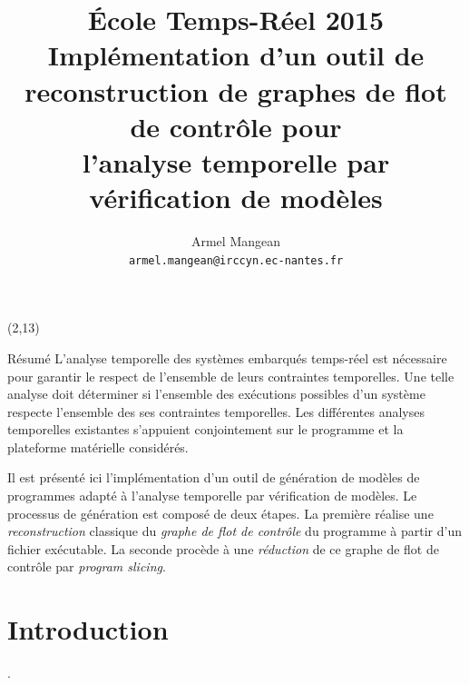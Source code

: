 \documentclass[final]{beamer}
\title{{\large École Temps-Réel 2015} \\[.3em]
  Implémentation d'un outil de \\
  reconstruction de graphes de flot de contrôle pour \\
  l'analyse temporelle par vérification de modèles}
\author{Armel Mangean \\
  \texttt{armel.mangean@irccyn.ec-nantes.fr}}
\begin{document}
  \begin{frame}

    
    \begin{textblock}{39}(2,13)
      \begin{block}{Résumé}\small
        L'analyse temporelle des systèmes embarqués temps-réel est nécessaire
        pour garantir le respect de l'ensemble de leurs contraintes
        temporelles. Une telle analyse doit déterminer si l'ensemble des
        exécutions possibles d'un système respecte l'ensemble des ses
        contraintes temporelles. Les différentes analyses temporelles existantes
        s'appuient conjointement sur le programme et la plateforme matérielle
        considérés.
        \vspace{.5em}
  
        Il est présenté ici l'implémentation d'un outil de génération de modèles
        de programmes adapté à l'analyse temporelle par vérification de
        modèles. Le processus de génération est composé de deux étapes. La
        première réalise une \textit{reconstruction} classique du \textit{graphe
          de flot de contrôle} du programme à partir d'un fichier exécutable. La
        seconde procède à une \textit{réduction} de ce graphe de flot de contrôle
        par \textit{program slicing}.
        \vspace{.4em}
      \end{block}
      \vspace{1em}
      
      \section{Introduction}
      \begin{block}{\thesection. \secname}
        

\end{block}
\end{textblock}
\end{frame}
\end{document}
